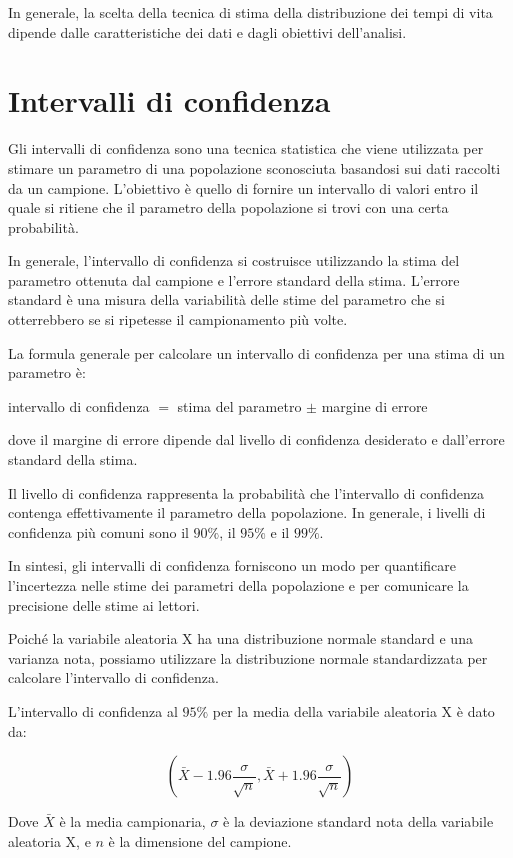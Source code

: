 In generale, la scelta della tecnica di stima della distribuzione dei tempi di vita dipende dalle caratteristiche dei dati e dagli obiettivi dell'analisi.

\section{Intervalli di confidenza}
Gli intervalli di confidenza sono una tecnica statistica che viene utilizzata per stimare un parametro di una popolazione sconosciuta basandosi sui dati raccolti da un campione. L'obiettivo è quello di fornire un intervallo di valori entro il quale si ritiene che il parametro della popolazione si trovi con una certa probabilità.

In generale, l'intervallo di confidenza si costruisce utilizzando la stima del parametro ottenuta dal campione e l'errore standard della stima. L'errore standard è una misura della variabilità delle stime del parametro che si otterrebbero se si ripetesse il campionamento più volte.

La formula generale per calcolare un intervallo di confidenza per una stima di un parametro è:

intervallo di confidenza $=$ stima del parametro $\pm$ margine di errore

dove il margine di errore dipende dal livello di confidenza desiderato e dall'errore standard della stima.

Il livello di confidenza rappresenta la probabilità che l'intervallo di confidenza contenga effettivamente il parametro della popolazione. In generale, i livelli di confidenza più comuni sono il $90\%$, il $95\%$ e il $99\%$.

In sintesi, gli intervalli di confidenza forniscono un modo per quantificare l'incertezza nelle stime dei parametri della popolazione e per comunicare la precisione delle stime ai lettori.


Poiché la variabile aleatoria X ha una distribuzione normale standard e una varianza nota, possiamo utilizzare la distribuzione normale standardizzata per calcolare l'intervallo di confidenza.

L'intervallo di confidenza al $95\%$ per la media della variabile aleatoria X è dato da:

$$(\bar{X}-1.96\frac{\sigma}{\sqrt{n}},\bar{X}+1.96\frac{\sigma}{\sqrt{n}})$$

Dove $\bar{X}$ è la media campionaria, $\sigma$ è la deviazione standard nota della variabile aleatoria X, e $n$ è la dimensione del campione.

